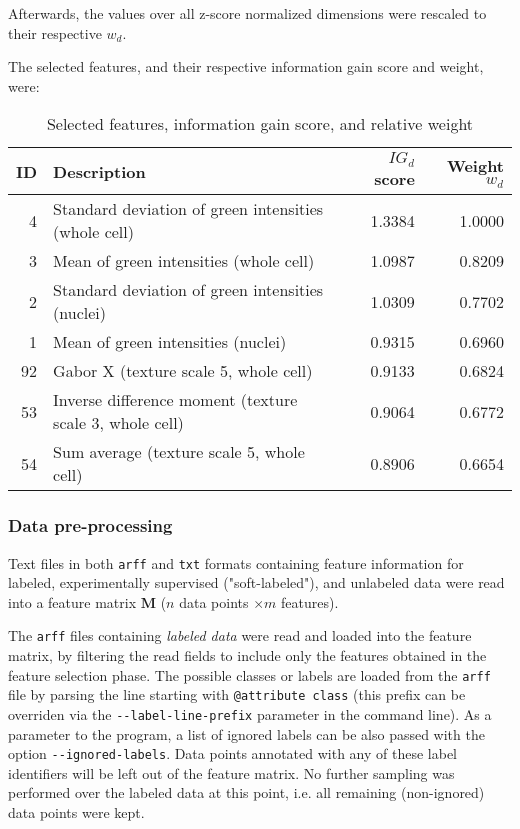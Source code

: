 \documentclass[oneside, a4paper, draft]{memoir} %
\begin{document}
Afterwards, the values over all z-score normalized dimensions were rescaled to their respective $w_d$.

The selected features, and their respective information gain score and weight, were: 

\begin{table}[here]
\centering
\begin{tabular}{rlrr}
	\hline
	ID & Description & $IG_d$ score & Weight $w_d$ \\
	\hline
	4 & Standard deviation of green intensities (whole cell) & 1.3384 & 1.0000\\
	3 & Mean of green intensities (whole cell) & 1.0987 & 0.8209\\
	2 & Standard deviation of green intensities (nuclei) & 1.0309 & 0.7702\\
	1 & Mean of green intensities (nuclei) & 0.9315 & 0.6960\\
	92 & Gabor X (texture scale 5, whole cell) & 0.9133 & 0.6824\\
    53 & Inverse difference moment (texture scale 3, whole cell) & 0.9064 & 0.6772\\
	54 & Sum average (texture scale 5, whole cell) & 0.8906 & 0.6654\\
	\hline
\end{tabular}
\caption{Selected features, information gain score, and relative weight}
\end{table}

\subsubsection{Data pre-processing}
Text files in both \texttt{arff} and \texttt{txt} formats containing feature information for labeled, experimentally
supervised ("soft-labeled"), and unlabeled data were read into a feature matrix $\mathbf M$ ($n$ data points
$\times m$ features).

The \texttt{arff} files containing \emph{labeled data} were read and loaded into the feature matrix, by filtering the
read fields to include only the features obtained in the feature selection phase. The possible classes or labels are
loaded from the \texttt{arf{}f} file by parsing the line starting with \texttt{@attribute class} (this prefix can be
overriden via the \texttt{-{}-label-line-prefix} parameter in the command line). As a parameter to the program, a list
of ignored labels can be also passed with the option \texttt{-{}-ignored-labels}. Data points annotated with any of
these label identifiers will be left out of the feature matrix. No further sampling was performed over the labeled
data at this point, i.e. all remaining (non-ignored) data points were kept.
\end{document}
